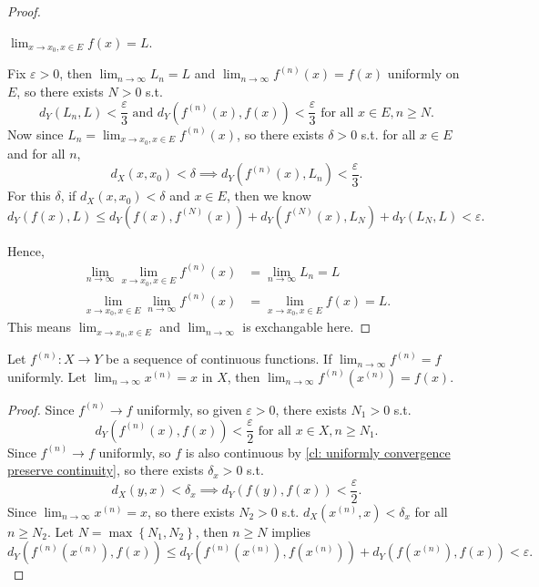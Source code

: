 \begin{proof}
    \begin{claim}
        \(\lim_{x \to x_0, x \in E} f(x) = L\). 
    \end{claim}    
    \begin{explanation}
        Fix \(\varepsilon > 0\), then \(\lim_{n \to \infty} L_n = L \) and \(\lim_{n \to \infty} f^{(n)}(x) = f(x) \) uniformly on \(E\), so there exists \(N > 0\) s.t. 
        \[
            d_Y \left( L_n, L \right) < \frac{\varepsilon}{3} \text{ and } d_Y \left( f^{(n)}(x), f(x) \right) < \frac{\varepsilon}{3} \text{ for all } x \in E, n \ge N.  
        \] 
        Now since \(L_n = \lim_{x \to x_0, x \in E} f^{(n)}(x)\), so there exists \(\delta > 0\) s.t. for all \(x \in E\) and for all \(n\),  
        \[
            d_X(x, x_0) < \delta \implies d_Y \left( f^{(n)}(x), L_n \right) < \frac{\varepsilon}{3}.
        \]  
        For this \(\delta \), if \(d_X(x, x_0) < \delta \) and \(x \in E\), then we know 
        \[
            d_Y (f(x), L) \le d_Y \left( f(x), f^{(N)}(x) \right) + d_Y \left( f^{(N)}(x), L_N \right) + d_Y \left( L_N, L \right) < \varepsilon.  
        \]     
    \end{explanation} 
    Hence, 
    \begin{align*}
        \lim_{n \to \infty} \lim_{x \to x_0, x \in E} f^{(n)}(x) &= \lim_{n \to \infty} L_n = L \\
        \lim_{x \to x_0, x \in E} \lim_{n \to \infty} f^{(n)}(x) &= \lim_{x \to x_0, x \in E} f(x) = L. 
    \end{align*}  
    This means \(\lim_{x \to x_0, x \in E}\) and \(\lim_{n \to \infty} \) is exchangable here.
\end{proof}

\begin{proposition}
    Let \(f^{(n)}:X \to Y\) be a sequence of continuous functions. If \(\lim_{n \to \infty} f^{(n)} = f \) uniformly. Let \(\lim_{n \to \infty} x^{(n)} = x \) in \(X\), then \(\lim_{n \to \infty} f^{(n)}\left( x^{(n)} \right) = f(x)  \).     
\end{proposition}
\begin{proof}
    Since \(f^{(n)} \to  f\) uniformly, so given \(\varepsilon > 0\), there exists \(N_1 > 0\) s.t. 
    \[
        d_Y \left( f^{(n)}(x), f(x) \right) < \frac{\varepsilon}{2} \text{ for all } x \in X, n \ge N_1.  
    \]  
    Since \(f^{(n)} \to f\) uniformly, so \(f\) is also continuous by \autoref{cl: uniformly convergence preserve continuity}, so there exists \(\delta _x > 0\) s.t. 
    \[
        d_X(y, x) < \delta _x \implies d_Y \left( f(y), f(x) \right) < \frac{\varepsilon}{2}. 
    \]     
    Since \(\lim_{n \to \infty} x^{(n)} = x \), so there exists \(N_2 > 0\) s.t. \(d_X \left( x^{(n)}, x \right) < \delta _x \) for all \(n \ge N_2\). Let \(N = \max \left\{ N_1, N_2 \right\} \), then \(n \ge N\) implies 
    \[
        d_Y \left( f^{(n)}\left( x^{(n)} \right), f(x)  \right) \le d_Y \left( f^{(n)} \left( x^{(n)} \right), f \left( x^{(n)} \right)   \right) + d_Y \left( f \left( x^{(n)} \right), f(x)  \right) < \varepsilon .  
    \]     
\end{proof}

